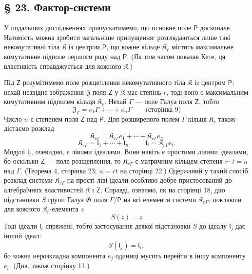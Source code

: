 \documentclass[11pt]{article}
\begin{document}
\subsection*{§ 23. Фактор-системи}\label{faktorensysteme}

У подальших дослідженнях припускатимемо, що основне поле \(\mathsf P\) досконале. Натомість можна зробити загальніше припущення: розглядаються лише такі некомутативні тіла \(\mathfrak K\) із центром \(\mathsf P\), що кожне кільце \(\mathfrak K_r\) містить максимальне комутативне підполе першого роду над \(\mathsf P\). (Як тим часом показав Кете, ця властивість справджується для кожного \(\mathfrak K\).)

Під \(\mathsf{Z}\) розумітимемо поле розщеплення некомутативного тіла \(\mathfrak K\) із центром \(\mathsf P\); нехай незвідне зображення \(\mathfrak Z\) поля \(\mathsf{Z}\) у \(\mathfrak K\) має степінь \(r\), тоді воно є максимальним комутативним підполем кільця \(\mathfrak K_r\). Нехай \(\Gamma\) --- поле Галуа поля \(\mathsf{Z}\), тобто
\[
\mathfrak Z_\Gamma=e_1\Gamma+\cdots+e_n\Gamma
\qquad\text{(сторінка 9)}
\]
Число \(n\) є степенем поля \(\mathsf{Z}\) над \(\mathsf P\). Для розширеного полем \(\Gamma\) кільця \(\mathfrak K_r\) також дістаємо розклад
\[
\mathfrak K_{r\Gamma}=\mathfrak K_{r\Gamma}e_1+\cdots+\mathfrak K_{r\Gamma}e_n
\]
\[
\mathfrak K_{r\Gamma}=\mathfrak l_1+\cdots+\mathfrak l_n,\qquad
\mathfrak l_i=\mathfrak K_{r\Gamma}e_i.
\]
Модулі \(\mathfrak l_i\), очевидно, є лівими ідеалами. Вони навіть є простими лівими ідеалами, бо оскільки \(\mathsf{Z}\) --- поле розщеплення, то \(\mathfrak K_{r\Gamma}\) є матричним кільцем степеня \(r\cdot t=n\) над \(\Gamma\). (Теорема 4, сторінка 23; \(n=rt\) на сторінці 22.) Одержаний у такий спосіб розклад системи \(\mathfrak K_{r\Gamma}\) на прості ліві ідеали особливо добре пристосований до алгебраїчних властивостей \(\mathfrak K\) і \(\mathsf{Z}\). Справді, означмо, як на сторінці 18, дію підстановки \(S\) групи Галуа \(\mathfrak G\) поля \(\Gamma/\mathsf P\) на всі елементи системи \(\mathfrak K_{r\Gamma}\), поклавши для кожного \(\mathfrak K_r\)-елемента \(z\)
\[
S(z)=z
\]
Тоді ідеали \(\mathfrak l_i\) спряжені, тобто застосування деякої підстановки \(S\) до ідеалу \(\mathfrak l_j\) дає інший ідеал:
\[
S(\mathfrak l_j)=\mathfrak l_i,
\]
бо кожна нерозкладна компонента \(e_j\) одиниці мусить перейти в іншу компоненту \(e_i\). (Див. також сторінку 11.)
\end{document}
